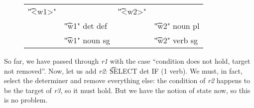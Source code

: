 \begin{figure}[h]
\centering
\begin{tabular}{p{0.6cm} l  p{0.6cm} l }
\t{"<w1>"}    &                     &  \t{"<w2>"}  &           \\
              & \t{"w1" det def}    & &      \t{"w2" noun pl}  \\
              & \t{"w1" noun sg}    & &      \t{"w2" verb sg}  \\
\end{tabular}
\end{figure}


So far, we have passed through {\em r1} with the case ``condition does not hold, target not removed''. Now, let us add {\em r2}: \t{SELECT det IF (1 verb)}. 
We must, in fact, select the determiner and remove everything else: 
the condition of {\em r2} happens to be the target of {\em r3}, so it must hold. 
But we have the notion of state now, so this is no problem.
